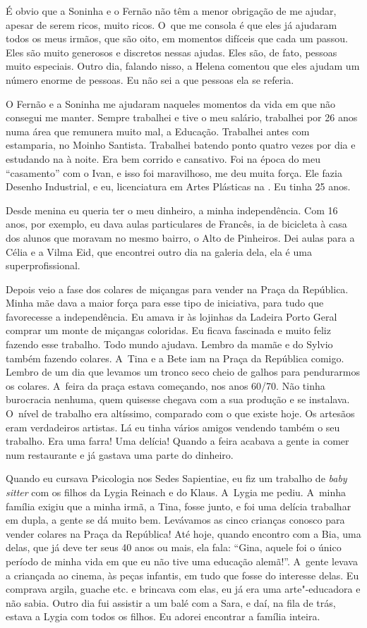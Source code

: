É obvio que a Soninha e o Fernão não têm a menor obrigação de me ajudar,
apesar de serem ricos, muito ricos. O~que me consola é que eles já
ajudaram todos os meus irmãos, que são oito, em momentos difíceis que
cada um passou. Eles são muito generosos e discretos nessas ajudas. Eles
são, de fato, pessoas muito especiais. Outro dia, falando nisso, a
Helena comentou que eles ajudam um número enorme de pessoas. Eu não sei
a que pessoas ela se referia.

O Fernão e a Soninha me ajudaram naqueles momentos da vida em que não
consegui me manter. Sempre trabalhei e tive o meu salário, trabalhei por
26 anos numa área que remunera muito mal, a Educação. Trabalhei antes
com estamparia, no Moinho Santista. Trabalhei batendo ponto quatro vezes
por dia e estudando na  à noite. Era bem corrido e cansativo. Foi na
época do meu ``casamento'' com o Ivan, e isso foi maravilhoso, me deu
muita força. Ele fazia Desenho Industrial, e eu, licenciatura em Artes
Plásticas na . Eu tinha 25 anos.

Desde menina eu queria ter o meu dinheiro, a minha independência. Com 16
anos, por exemplo, eu dava aulas particulares de Francês, ia de
bicicleta à casa dos alunos que moravam no mesmo bairro, o Alto de
Pinheiros. Dei aulas para a Célia e a Vilma Eid, que encontrei outro dia
na galeria dela, ela é uma superprofissional.

Depois veio a fase dos colares de miçangas para vender na Praça da
República. Minha mãe dava a maior força para esse tipo de iniciativa,
para tudo que favorecesse a independência. Eu amava ir às lojinhas da
Ladeira Porto Geral comprar um monte de miçangas coloridas. Eu ficava
fascinada e muito feliz fazendo esse trabalho. Todo mundo ajudava.
Lembro da mamãe e do Sylvio também fazendo colares. A~Tina e a Bete iam
na Praça da República comigo. Lembro de um dia que levamos um tronco
seco cheio de galhos para pendurarmos os colares. A~feira da praça
estava começando, nos anos 60/70. Não tinha burocracia nenhuma, quem
quisesse chegava com a sua produção e se instalava. O~nível de trabalho
era altíssimo, comparado com o que existe hoje. Os artesãos eram
verdadeiros artistas. Lá eu tinha vários amigos vendendo também o seu
trabalho. Era uma farra! Uma delícia! Quando a feira acabava a gente ia
comer num restaurante e já gastava uma parte do dinheiro.

Quando eu cursava Psicologia nos Sedes Sapientiae, eu fiz um trabalho de
\emph{baby sitter} com os filhos da Lygia Reinach e do Klaus. A~Lygia me
pediu. A~minha família exigiu que a minha irmã, a Tina, fosse junto, e
foi uma delícia trabalhar em dupla, a gente se dá muito bem. Levávamos
as cinco crianças conosco para vender colares na Praça da República! Até
hoje, quando encontro com a Bia, uma delas, que já deve ter seus 40 anos
ou mais, ela fala: ``Gina, aquele foi o único período de minha vida em
que eu não tive uma educação alemã!''. A~gente levava a criançada ao
cinema, às peças infantis, em tudo que fosse do interesse delas. Eu
comprava argila, guache etc. e brincava com elas, eu já era uma
arte"-educadora e não sabia. Outro dia fui assistir a um balé com a Sara,
e daí, na fila de trás, estava a Lygia com todos os filhos. Eu adorei
encontrar a família inteira.


